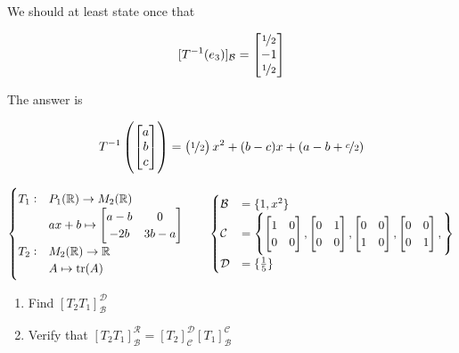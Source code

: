 \begin{example}
	We should at least state once that 

	\[[T^{-1}(e_3)]_\mathcal{B} = \begin{bmatrix}
		\nicefrac{1}{2}\\-1\\\nicefrac{1}{2}
	\end{bmatrix}\]

	The answer is

	\[T^{-1}\left(\begin{bmatrix}
		a\\b\\c
	\end{bmatrix}\right) = \left(\nicefrac{1}{2}\right) x^2 + (b-c) x + (a - b + \nicefrac{c}{2})\]
\end{example}

\begin{example}
	\[\begin{cases}
		T_1: &P_1(\mathbb{R}) \to M_2(\mathbb{R})\\
		&ax + b \mapsto \begin{bmatrix}
			a-b&0\\-2b&3b-a
		\end{bmatrix}\\
		T_2: & M_2(\mathbb{R}) \to \mathbb{R}\\
		&A \mapsto \tr(A)
	\end{cases} \qquad \begin{cases}
		\mathcal{B} &= \{1, x^2\}\\
		\mathcal{C} &= \left\{\begin{bmatrix}
			1&0\\0&0
		\end{bmatrix}, \begin{bmatrix}
			0&1\\0&0
		\end{bmatrix}, \begin{bmatrix}
			0&0\\1&0
		\end{bmatrix}, \begin{bmatrix}
			0&0\\0&1
		\end{bmatrix}, \right\}\\
		\mathcal{D} &= \{\frac{1}{5}\}
	\end{cases}\]

	\begin{enumerate}
		\item Find $[T_2T_1]^\mathcal{D}_\mathcal{B}$
		\item Verify that $[T_2T_1]_\mathcal{B}^\mathcal{R} = [T_2]_\mathcal{C}^\mathcal{D}[T_1]_\mathcal{B}^\mathcal{C}$
	\end{enumerate}
\end{example}

